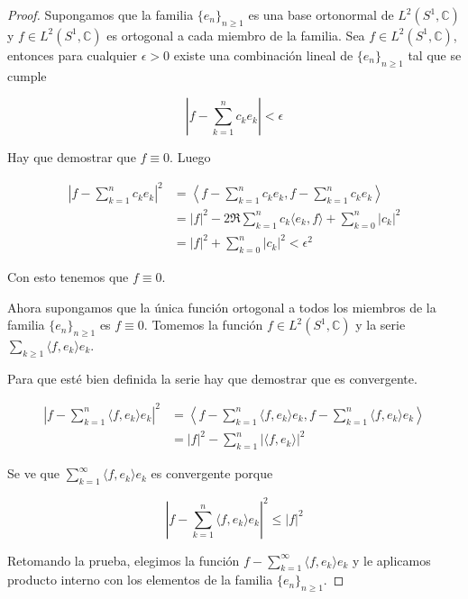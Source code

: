\begin{proof}
	Supongamos que la familia $\{e_n\}_{n \geq 1}$ es una base ortonormal de $L^2(S^1,\mathbb{C})$ y $f \in L^2(S^1,\mathbb{C})$ es ortogonal a cada miembro de la familia. Sea $f \in L^2(S^1,\mathbb{C})$, entonces para cualquier $\epsilon > 0$ existe una combinación lineal de $\{e_n\}_{n \geq 1}$ tal que se cumple
	
	\begin{equation}
		\left| f - \sum_{k=1}^{n} c_k e_k \right| < \epsilon
	\end{equation}
	
	Hay que demostrar que $f \equiv 0$. Luego
	
	\begin{align}
		\left| f - \sum_{k=1}^{n} c_k e_k \right|^2 &= \left\langle f - \sum_{k=1}^{n} c_k e_k,f - \sum_{k=1}^{n} c_k e_k \right\rangle\\
		&= |f|^2-2\Re \sum_{k=1}^{n} c_k \langle e_k,f \rangle + \sum_{k=0}^{n} |c_k|^2\\
		&= |f|^2 + \sum_{k=0}^{n} |c_k|^2 < \epsilon^2
	\end{align}
	
	Con esto tenemos que $f \equiv 0$.
	
	Ahora supongamos que la única función ortogonal a todos los miembros de la familia $\{e_n\}_{n \geq 1}$ es $f \equiv 0$. Tomemos la función $f \in L^2(S^1,\mathbb{C})$ y la serie $\sum_{k \geq 1} \langle f,e_k \rangle e_k$.
	
	Para que esté bien definida la serie hay que demostrar que es convergente.
	
	\begin{align}
		\left| f - \sum_{k=1}^{n} \langle f,e_k \rangle e_k \right|^2 &= \left\langle f - \sum_{k=1}^{n} \langle f,e_k \rangle e_k,f - \sum_{k=1}^{n} \langle f,e_k \rangle e_k \right\rangle\\
		&= |f|^2 - \sum_{k=1}^{n} |\langle f,e_k \rangle|^2
	\end{align}
	
	Se ve que $\sum_{k=1}^{\infty} \langle f,e_k \rangle e_k$ es convergente porque
	
	\begin{equation}
		\left| f - \sum_{k=1}^{n} \langle f,e_k \rangle e_k \right|^2 \leq |f|^2
	\end{equation}
	
	Retomando la prueba, elegimos la función $f - \sum_{k=1}^{\infty} \langle f,e_k \rangle e_k$ y le aplicamos producto interno con los elementos de la familia $\{e_n\}_{n \geq 1}$.
	

\end{proof}
